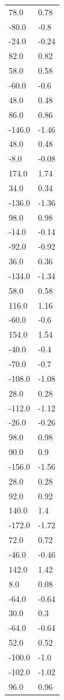 \begin{longtable}{ll}
78.0 & 0.78 \\
-80.0 & -0.8 \\
-24.0 & -0.24 \\
82.0 & 0.82 \\
58.0 & 0.58 \\
-60.0 & -0.6 \\
48.0 & 0.48 \\
86.0 & 0.86 \\
-146.0 & -1.46 \\
48.0 & 0.48 \\
-8.0 & -0.08 \\
174.0 & 1.74 \\
34.0 & 0.34 \\
-136.0 & -1.36 \\
98.0 & 0.98 \\
-14.0 & -0.14 \\
-92.0 & -0.92 \\
36.0 & 0.36 \\
-134.0 & -1.34 \\
58.0 & 0.58 \\
116.0 & 1.16 \\
-60.0 & -0.6 \\
154.0 & 1.54 \\
-40.0 & -0.4 \\
-70.0 & -0.7 \\
-108.0 & -1.08 \\
28.0 & 0.28 \\
-112.0 & -1.12 \\
-26.0 & -0.26 \\
98.0 & 0.98 \\
90.0 & 0.9 \\
-156.0 & -1.56 \\
28.0 & 0.28 \\
92.0 & 0.92 \\
140.0 & 1.4 \\
-172.0 & -1.72 \\
72.0 & 0.72 \\
-46.0 & -0.46 \\
142.0 & 1.42 \\
8.0 & 0.08 \\
-64.0 & -0.64 \\
30.0 & 0.3 \\
-64.0 & -0.64 \\
52.0 & 0.52 \\
-100.0 & -1.0 \\
-102.0 & -1.02 \\
96.0 & 0.96 \\

\end{longtable}
